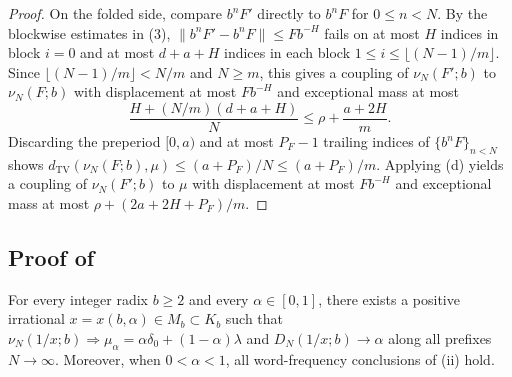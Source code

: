 \documentclass[11pt]{article}
\newcommand{\dist}[1]{\lVert #1\rVert}
\begin{document}
\begin{proof}
On the folded side, compare $b^nF'$ directly to $b^nF$ for $0\le n<N$. By the blockwise estimates in (3), $\dist{b^nF'-b^nF}\le Fb^{-H}$ fails on at most $H$ indices in block $i=0$ and at most $d+a+H$ indices in each block $1\le i\le\lfloor(N-1)/m\rfloor$. Since $\lfloor(N-1)/m\rfloor<N/m$ and $N\ge m$, this gives a coupling of $\nu_N(F';b)$ to $\nu_N(F;b)$ with displacement at most $Fb^{-H}$ and exceptional mass at most
\[
\frac{H+(N/m)(d+a+H)}{N}\le\rho+\frac{a+2H}{m}.
\]
Discarding the preperiod $[0,a)$ and at most $P_F-1$ trailing indices of $\{b^nF\}_{n<N}$ shows $d_{\mathrm{TV}}(\nu_N(F;b),\mu)\le(a+P_F)/N\le(a+P_F)/m$. Applying (d) yields a coupling of $\nu_N(F';b)$ to $\mu$ with displacement at most $Fb^{-H}$ and exceptional mass at most $\rho+(2a+2H+P_F)/m$.
\end{proof}

\subsection{Proof of \texorpdfstring{}{Theorem A}}

\begin{theorem}\label{thm:allradix}
For every integer radix $b\ge2$ and every $\alpha\in[0,1]$, there exists a positive irrational $x=x(b,\alpha)\in M_b\subset K_b$ such that $\nu_N(1/x;b)\Rightarrow\mu_\alpha=\alpha\delta_0+(1-\alpha)\lambda$ and $D_N(1/x;b)\to\alpha$ along all prefixes $N\to\infty$. Moreover, when $0<\alpha<1$, all word-frequency conclusions of \textup{(ii)} hold.
\end{theorem}
\end{document}
